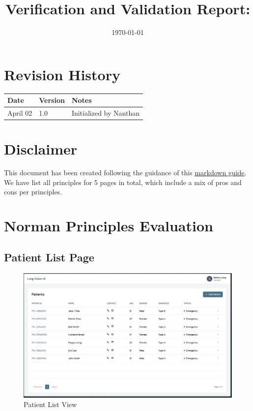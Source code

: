 \documentclass[12pt, titlepage]{article}
\begin{document}
\title{Verification and Validation Report: \progname} 
\author{\authname}
\date{\today}
	
\maketitle


\section{Revision History}
\begin{tabularx}{\textwidth}{p{3cm}p{2cm}X}
\toprule {\bf Date} & {\bf Version} & {\bf Notes}\\
\midrule
April 02 & 1.0 & Initialized by Nanthan\\

\bottomrule
\end{tabularx}


\newpage
\tableofcontents
\listoftables %
\listoffigures %

\section{Disclaimer}
This document has been created following the guidance of this \href{https://github.com/smiths/capTemplate/blob/main/docs/Extras/NormansPrinciples/Expectations.md}{markdown guide}. We have list all principles for 5 pages in total, which include a mix of pros and cons per principles.

\section{Norman Principles Evaluation}
\newpage



\subsection{Patient List Page}

  \begin{figure}[ht!] 
    \centering
    \includegraphics[scale=0.25]{../../assets/patient_list.png}
    \caption{Patient List View}
    \label{fig:patient_list}
  \end{figure}
\end{document}
